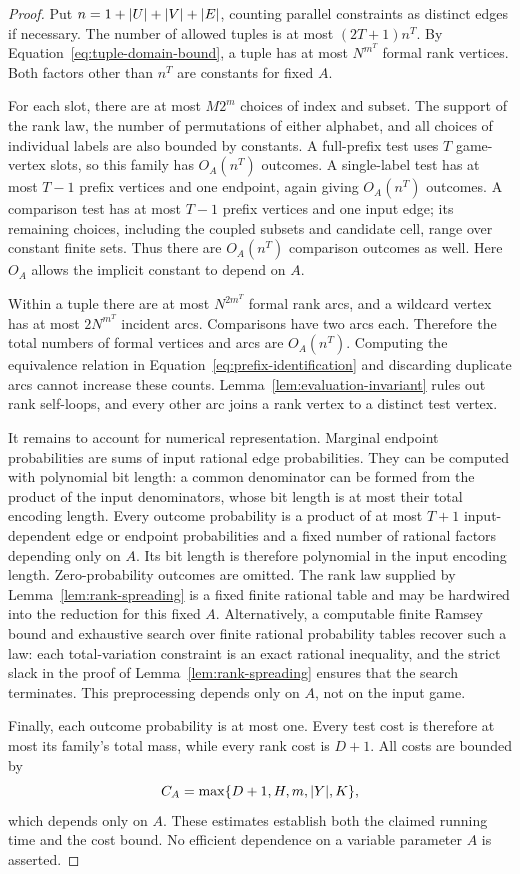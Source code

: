 \begin{proof}
Put $n=1+\lvert U\rvert+\lvert V\rvert+\lvert E\rvert$, counting parallel constraints as
distinct edges if necessary.  The number of allowed tuples is at most
$(2T+1)n^T$.  By Equation~\eqref{eq:tuple-domain-bound}, a tuple has at most
$N^{m^T}$ formal rank vertices.  Both factors other than $n^T$ are constants
for fixed $A$.

For each slot, there are at most $M2^m$ choices of index and subset.  The
support of the rank law, the number of permutations of either alphabet,
and all choices of individual labels are also bounded by constants.  A
full-prefix test uses $T$ game-vertex slots, so this family has
$O_A(n^T)$ outcomes.  A single-label test has at most $T-1$ prefix vertices and one
endpoint, again giving $O_A(n^T)$ outcomes.  A comparison test has at most
$T-1$ prefix vertices and one input edge; its remaining choices, including
the coupled subsets and candidate cell, range over constant finite sets.
Thus there are $O_A(n^T)$ comparison outcomes as well.  Here $O_A$ allows
the implicit constant to depend on $A$.

Within a tuple there are at most $N^{2m^T}$ formal rank arcs, and a wildcard
vertex has at most $2N^{m^T}$ incident arcs.  Comparisons have two arcs
each.  Therefore the total numbers of formal vertices and arcs are
$O_A(n^T)$.  Computing the equivalence relation in
Equation~\eqref{eq:prefix-identification} and discarding duplicate arcs
cannot increase these counts.  Lemma~\ref{lem:evaluation-invariant} rules
out rank self-loops, and every other arc joins a rank vertex to a distinct
test vertex.

It remains to account for numerical representation.  Marginal endpoint
probabilities are sums of input rational edge probabilities.  They can be
computed with polynomial bit length: a common denominator can be formed
from the product of the input denominators, whose bit length is at most
their total encoding length.  Every outcome probability is a product of
at most $T+1$ input-dependent edge or endpoint probabilities and a fixed
number of rational factors depending only on $A$.  Its bit length is
therefore polynomial in the input encoding length.  Zero-probability
outcomes are omitted.  The rank law supplied by
Lemma~\ref{lem:rank-spreading} is a fixed finite rational table and may be
hardwired into the reduction for this fixed $A$. Alternatively, a
computable finite Ramsey bound and exhaustive search over finite rational
probability tables recover such a law: each total-variation constraint
is an exact rational inequality, and the strict slack in the proof of
Lemma~\ref{lem:rank-spreading} ensures that the search terminates.
This preprocessing depends only on $A$, not on the input game.

Finally, each outcome probability is at most one.  Every test cost is
therefore at most its family's total mass, while every rank cost is $D+1$.
All costs are bounded by
\[
  C_A=\max\{D+1,H,m,\lvert Y\rvert,K\},
\]
which depends only on $A$.  These estimates establish both the claimed
running time and the cost bound.  No efficient dependence on a variable
parameter $A$ is asserted.
\end{proof}
